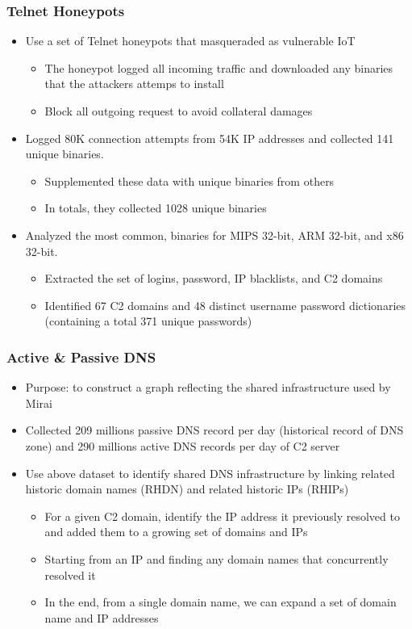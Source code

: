 \documentclass{beamer}
\begin{document}
\begin{frame}
	\frametitle{Telnet Honeypots}
	\begin{itemize}
		\item<+-> Use a set of Telnet honeypots that masqueraded as vulnerable IoT
		\begin{itemize}
			\item<+-> The honeypot logged all incoming traffic and downloaded any binaries that the attackers attemps to install
			\item<+-> Block all outgoing request to avoid collateral damages
		\end{itemize}
		\item<+-> Logged 80K connection attempts from 54K IP addresses and collected 141 unique binaries.
		\begin{itemize}
			\item<+-> Supplemented these data with unique binaries from others
			\item<+-> In totals, they collected 1028 unique binaries
		\end{itemize}
		\item<+-> Analyzed the most common, binaries for MIPS 32-bit, ARM 32-bit, and x86 32-bit.
		\begin{itemize}
			\item<+-> Extracted the set of logins, password, IP blacklists, and C2 domains
			\item<+-> Identified 67 C2 domains and 48 distinct username password dictionaries (containing a total 371 unique passwords)
		\end{itemize}
	\end{itemize}
\end{frame}

\begin{frame}
	\frametitle{Active \& Passive DNS}
	\begin{itemize}
		\item<+-> Purpose: to construct a graph reflecting the shared infrastructure used by Mirai
		\item<+-> Collected 209 millions passive DNS record per day (historical record of DNS zone) and 290 millions active DNS records per day of C2 server
		\item<+-> Use above dataset to identify shared DNS infrastructure by linking related historic domain names (RHDN) and related historic IPs (RHIPs)
		\begin{itemize}
			\item<+-> For a given C2 domain, identify the IP address it previously resolved to and added them to a growing set of domains and IPs
			\item<+-> Starting from an IP and finding any domain names that concurrently resolved it
			\item<+-> In the end, from a single domain name, we can expand a set of domain name and IP addresses
		\end{itemize}
	\end{itemize}
\end{frame}
\end{document}
